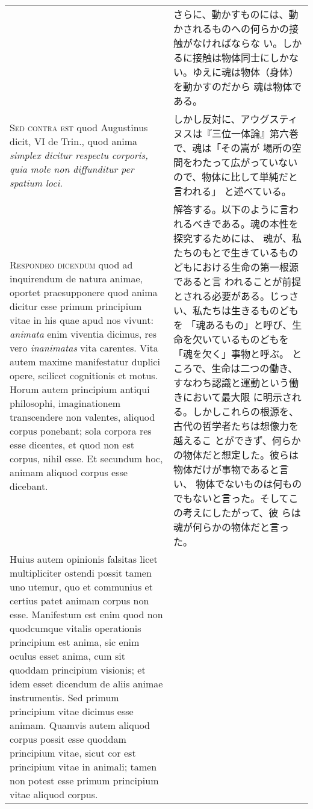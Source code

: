 \documentclass[paper=a4paper,fontsize=10pt,jafontsize=9pt,titlepage]{jlreq}
\begin{document}
\begin{longtable}{p{21em}p{21em}}
&

さらに、動かすものには、動かされるものへの何らかの接触がなければならな
い。しかるに接触は物体同士にしかない。ゆえに魂は物体（身体）を動かすのだから
魂は物体である。

\\


{\scshape Sed contra est} quod Augustinus dicit, VI de Trin., quod anima {\itshape simplex
 dicitur respectu corporis, quia mole non diffunditur per spatium
 loci}.


&

しかし反対に、アウグスティヌスは『三位一体論』第六巻で、魂は「その嵩が
場所の空間をわたって広がっていないので、物体に比して単純だと言われる」
と述べている。

\\



{\scshape Respondeo dicendum} quod ad inquirendum de natura animae, oportet
praesupponere quod anima dicitur esse primum principium vitae in his
quae apud nos vivunt: {\itshape animata} enim viventia dicimus, res vero
{\itshape inanimatas} vita carentes. Vita autem maxime manifestatur duplici
opere, scilicet cognitionis et motus. Horum autem principium antiqui
philosophi, imaginationem transcendere non valentes, aliquod corpus
ponebant; sola corpora res esse dicentes, et quod non est corpus,
nihil esse. Et secundum hoc, animam aliquod corpus esse
dicebant. 


&

解答する。以下のように言われるべきである。魂の本性を探究するためには、
魂が、私たちのもとで生きているものどもにおける生命の第一根源であると言
われることが前提とされる必要がある。じっさい、私たちは生きるものどもを
「魂あるもの」と呼び、生命を欠いているものどもを「魂を欠く」事物と呼ぶ。
ところで、生命は二つの働き、すなわち認識と運動という働きにおいて最大限
に明示される。しかしこれらの根源を、古代の哲学者たちは想像力を越えるこ
とができず、何らかの物体だと想定した。彼らは物体だけが事物であると言い、
物体でないものは何ものでもないと言った。そしてこの考えにしたがって、彼
らは魂が何らかの物体だと言った。

\\



Huius autem opinionis falsitas licet multipliciter ostendi
possit tamen uno utemur, quo et communius et certius patet animam
corpus non esse. Manifestum est enim quod non quodcumque vitalis
operationis principium est anima, sic enim oculus esset anima, cum sit
quoddam principium visionis; et idem esset dicendum de aliis animae
instrumentis. Sed primum principium vitae dicimus esse animam. Quamvis
autem aliquod corpus possit esse quoddam principium vitae, sicut cor
est principium vitae in animali; tamen non potest esse primum
principium vitae aliquod corpus. 



\end{longtable}
\end{document}

